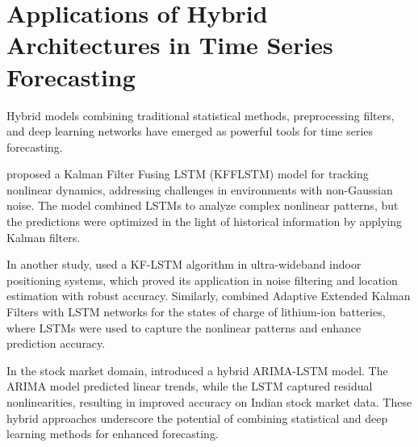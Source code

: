 \section{Applications of Hybrid Architectures in Time Series Forecasting}
Hybrid models combining traditional statistical methods, preprocessing filters, and deep learning networks have emerged as powerful tools for time series forecasting.  

\textcite{song_improved_2022} proposed a Kalman Filter Fusing LSTM (KFFLSTM) model for tracking nonlinear dynamics, addressing challenges in environments with non-Gaussian noise. The model combined LSTMs to analyze complex nonlinear patterns, but the predictions were optimized in the light of historical information by applying Kalman filters.  

In another study, \textcite{tian_application_2024} used a KF-LSTM algorithm in ultra-wideband indoor positioning systems, which proved its application in noise filtering and location estimation with robust accuracy. Similarly, \textcite{wang_hybrid_2024} combined Adaptive Extended Kalman Filters with LSTM networks for the states of charge of lithium-ion batteries, where LSTMs were used to capture the nonlinear patterns and enhance prediction accuracy. 

In the stock market domain, \textcite{sahni_neoteric_2022} introduced a hybrid ARIMA-LSTM model. The ARIMA model predicted linear trends, while the LSTM captured residual nonlinearities, resulting in improved accuracy on Indian stock market data. These hybrid approaches underscore the potential of combining statistical and deep learning methods for enhanced forecasting.  


